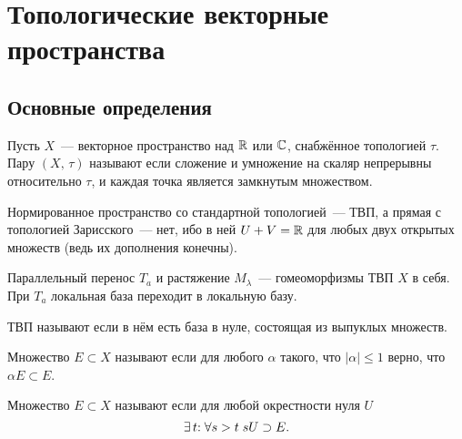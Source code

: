 \documentclass{notes}
\begin{document}
	\title{}
	\author{}
	\date{}
	\maketitle


	\tableofcontents

\chapter{Топологические векторные пространства}

\section{Основные определения}

	\begin{de}
		Пусть $X$~--- векторное пространство над $\mathbb{R}$ или $\mathbb{C}$, снабжённое топологией $\tau$. Пару $(X, \, \tau)$ называют  если сложение и умножение на скаляр непрерывны относительно $\tau$, и каждая точка является замкнутым множеством.
	\end{de}

	\begin{exm}
		Нормированное пространство со стандартной топологией~--- ТВП, а прямая с топологией Зарисского~--- нет, ибо в ней $U + V = \mathbb{R}$ для любых двух открытых множеств (ведь их дополнения конечны).
	\end{exm}

	\begin{st}
		Параллельный перенос $T_a$ и растяжение $M_{\lambda}$~--- гомеоморфизмы ТВП $X$ в себя. При $T_a$ локальная база переходит в локальную базу.
	\end{st}

	\begin{de}
		ТВП называют  если в нём есть база в нуле, состоящая из выпуклых множеств.
	\end{de}

	\begin{de}
		Множество $E \subset X$ называют  если для любого $\alpha$ такого, что $|\alpha| \leqslant 1$ верно, что $\alpha E \subset E$.
	\end{de}

	\begin{de}
		Множество $E \subset X$ называют  если для любой окрестности нуля $U$
		\[
			\exists \, t \text{\text{:}} \; \forall s > t \; sU \supset E.
		\] 
	\end{de}
\end{document}
